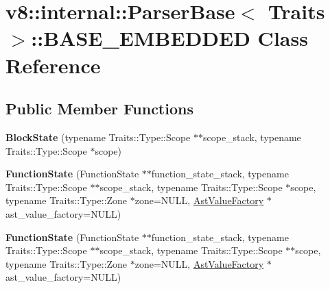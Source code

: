 \hypertarget{classv8_1_1internal_1_1_parser_base_1_1_b_a_s_e___e_m_b_e_d_d_e_d}{}\section{v8\+:\+:internal\+:\+:Parser\+Base$<$ Traits $>$\+:\+:B\+A\+S\+E\+\_\+\+E\+M\+B\+E\+D\+D\+E\+D Class Reference}
\label{classv8_1_1internal_1_1_parser_base_1_1_b_a_s_e___e_m_b_e_d_d_e_d}
\subsection*{Public Member Functions}
\begin{DoxyCompactItemize}
\item 
\hypertarget{classv8_1_1internal_1_1_parser_base_1_1_b_a_s_e___e_m_b_e_d_d_e_d_a0ef253e8b3c94f7fc93423ad885d3486}{}{\bfseries Block\+State} (typename Traits\+::\+Type\+::\+Scope $\ast$$\ast$scope\+\_\+stack, typename Traits\+::\+Type\+::\+Scope $\ast$scope)\label{classv8_1_1internal_1_1_parser_base_1_1_b_a_s_e___e_m_b_e_d_d_e_d_a0ef253e8b3c94f7fc93423ad885d3486}

\item 
\hypertarget{classv8_1_1internal_1_1_parser_base_1_1_b_a_s_e___e_m_b_e_d_d_e_d_a02075172691be9b987b64dd7b3b9541d}{}{\bfseries Function\+State} (Function\+State $\ast$$\ast$function\+\_\+state\+\_\+stack, typename Traits\+::\+Type\+::\+Scope $\ast$$\ast$scope\+\_\+stack, typename Traits\+::\+Type\+::\+Scope $\ast$scope, typename Traits\+::\+Type\+::\+Zone $\ast$zone=N\+U\+L\+L, \hyperlink{classv8_1_1internal_1_1_ast_value_factory}{Ast\+Value\+Factory} $\ast$ast\+\_\+value\+\_\+factory=N\+U\+L\+L)\label{classv8_1_1internal_1_1_parser_base_1_1_b_a_s_e___e_m_b_e_d_d_e_d_a02075172691be9b987b64dd7b3b9541d}

\item 
\hypertarget{classv8_1_1internal_1_1_parser_base_1_1_b_a_s_e___e_m_b_e_d_d_e_d_ade7f7217aebe225b046c2518c246d7f4}{}{\bfseries Function\+State} (Function\+State $\ast$$\ast$function\+\_\+state\+\_\+stack, typename Traits\+::\+Type\+::\+Scope $\ast$$\ast$scope\+\_\+stack, typename Traits\+::\+Type\+::\+Scope $\ast$$\ast$scope, typename Traits\+::\+Type\+::\+Zone $\ast$zone=N\+U\+L\+L, \hyperlink{classv8_1_1internal_1_1_ast_value_factory}{Ast\+Value\+Factory} $\ast$ast\+\_\+value\+\_\+factory=N\+U\+L\+L)\label{classv8_1_1internal_1_1_parser_base_1_1_b_a_s_e___e_m_b_e_d_d_e_d_ade7f7217aebe225b046c2518c246d7f4}


\end{DoxyCompactItemize}
